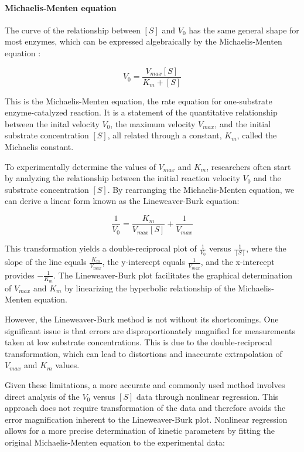 \paragraph{Michaelis-Menten equation}

The curve of the relationship between $[S]$ and $V_0$ has the same general shape for most enzymes, 
which can be expressed algebraically by the Michaelis-Menten equation \cite{MichaelisMentenEq}:

$$
V_0=\frac{V_{max}[S]}{K_m+[S]}
$$

This is the Michaelis-Menten equation, the rate equation for one-substrate enzyme-catalyzed reaction.
It is a statement of the quantitative relationship between the inital velocity $V_0$, 
the maximum velocity $V_{max}$, and the initial substrate concentration $[S]$, all related through a 
constant, $K_m$, called the Michaelis constant.

To experimentally determine the values of $V_{max}$ and $K_m$, researchers often start by analyzing 
the relationship between the initial reaction velocity $V_0$ and the substrate concentration $[S]$. 
By rearranging the Michaelis-Menten equation, we can derive a linear form known as the Lineweaver-Burk 
equation:

$$
\frac{1}{V_0} = \frac{K_m}{V_{max}[S]} + \frac{1}{V_{max}}
$$

This transformation yields a double-reciprocal plot of $\frac{1}{V_0}$ versus $\frac{1}{[S]}$, where 
the slope of the line equals $\frac{K_m}{V_{max}}$, the y-intercept equals $\frac{1}{V_{max}}$, and 
the x-intercept provides $-\frac{1}{K_m}$. The Lineweaver-Burk plot facilitates the graphical 
determination of $V_{max}$ and $K_m$ by linearizing the hyperbolic relationship of the Michaelis-Menten 
equation.

However, the Lineweaver-Burk method is not without its shortcomings. One significant issue is that 
errors are disproportionately magnified for measurements taken at low substrate concentrations. 
This is due to the double-reciprocal transformation, which can lead to distortions and inaccurate 
extrapolation of $V_{max}$ and $K_m$ values. 

Given these limitations, a more accurate and commonly used method involves direct analysis of 
the $V_0$ versus $[S]$ data through nonlinear regression. This approach does not require 
transformation of the data and therefore avoids the error magnification inherent to the Lineweaver-Burk 
plot. Nonlinear regression allows for a more precise determination of kinetic parameters by fitting 
the original Michaelis-Menten equation to the experimental data:

